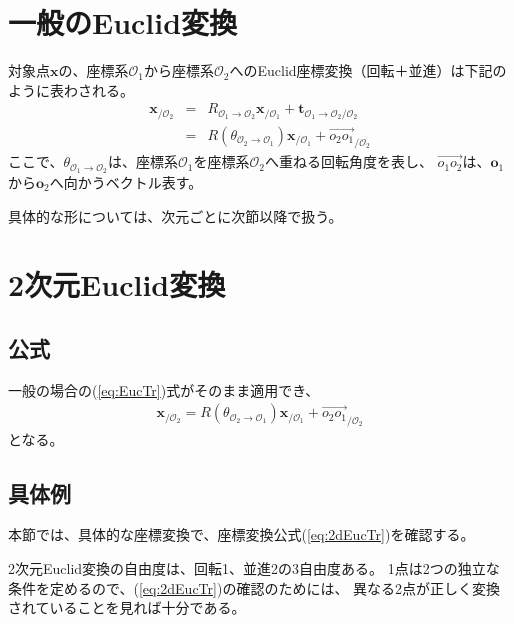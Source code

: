 \documentclass[10pt]{jarticle}
\begin{document}
\section{一般のEuclid変換}
対象点$\boldsymbol{x}$の、座標系$\mathcal{O}_1$から座標系$\mathcal{O}_2$へのEuclid座標変換（回転＋並進）は下記のように表わされる。
\begin{eqnarray}
\boldsymbol x_{/\mathcal{O}_2} 
&=& R_{\mathcal O_1\rightarrow \mathcal O_2} \boldsymbol x_{/\mathcal O_1} + \boldsymbol t_{\mathcal O_1\rightarrow \mathcal O_2 /\mathcal O_2} \\
&=& R(\theta_{\mathcal O_2\rightarrow \mathcal O_1}) \boldsymbol x_{/\mathcal O_1} + \overrightarrow{o_2 o_1}_{/\mathcal O_2}\label{eq:EucTr}
\end{eqnarray}
ここで、$\theta_{\mathcal O_1\rightarrow \mathcal O_2}$は、座標系$\mathcal{O}_1$を座標系$\mathcal{O}_2$へ重ねる回転角度を表し、
$\overrightarrow{o_1 o_2}$は、$\boldsymbol{o}_1$から$\boldsymbol{o}_2$へ向かうベクトル表す。

具体的な形については、次元ごとに次節以降で扱う。



\section{2次元Euclid変換}
\subsection{公式}
一般の場合の(\ref{eq:EucTr})式がそのまま適用でき、
\begin{eqnarray}
\boldsymbol x_{/\mathcal{O}_2} 
= R(\theta_{\mathcal O_2\rightarrow \mathcal O_1}) \boldsymbol x_{/\mathcal O_1} + \overrightarrow{o_2 o_1}_{/\mathcal O_2}
\label{eq:2dEucTr}
\end{eqnarray}
となる。


\subsection{具体例}
本節では、具体的な座標変換で、座標変換公式(\ref{eq:2dEucTr})を確認する。

2次元Euclid変換の自由度は、回転1、並進2の3自由度ある。
1点は2つの独立な条件を定めるので、(\ref{eq:2dEucTr})の確認のためには、
異なる2点が正しく変換されていることを見れば十分である。
\end{document}
